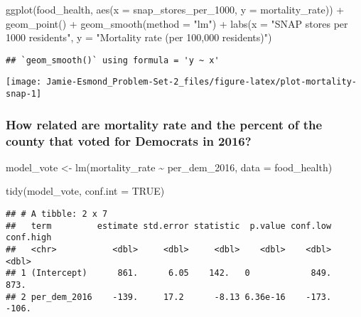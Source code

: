\documentclass[
]{article}
\newenvironment{Shaded}{\begin{snugshade}}{\end{snugshade}}
\newcommand{\AttributeTok}[1]{\textcolor[rgb]{0.77,0.63,0.00}{#1}}
\newcommand{\ConstantTok}[1]{\textcolor[rgb]{0.00,0.00,0.00}{#1}}
\newcommand{\FunctionTok}[1]{\textcolor[rgb]{0.00,0.00,0.00}{#1}}
\newcommand{\NormalTok}[1]{#1}
\newcommand{\OtherTok}[1]{\textcolor[rgb]{0.56,0.35,0.01}{#1}}
\newcommand{\SpecialCharTok}[1]{\textcolor[rgb]{0.00,0.00,0.00}{#1}}
\newcommand{\StringTok}[1]{\textcolor[rgb]{0.31,0.60,0.02}{#1}}
\begin{document}
\begin{Shaded}
\begin{Highlighting}[]
\FunctionTok{ggplot}\NormalTok{(food\_health, }\FunctionTok{aes}\NormalTok{(}\AttributeTok{x =}\NormalTok{ snap\_stores\_per\_1000, }\AttributeTok{y =}\NormalTok{ mortality\_rate)) }\SpecialCharTok{+}
  \FunctionTok{geom\_point}\NormalTok{() }\SpecialCharTok{+}
  \FunctionTok{geom\_smooth}\NormalTok{(}\AttributeTok{method =} \StringTok{"lm"}\NormalTok{) }\SpecialCharTok{+}
  \FunctionTok{labs}\NormalTok{(}\AttributeTok{x =} \StringTok{"SNAP stores per 1000 residents"}\NormalTok{, }
       \AttributeTok{y =} \StringTok{"Mortality rate (per 100,000 residents)"}\NormalTok{)}
\end{Highlighting}
\end{Shaded}

\begin{verbatim}
## `geom_smooth()` using formula = 'y ~ x'
\end{verbatim}

\begin{center}\texttt{[image: Jamie-Esmond\_Problem-Set-2\_files/figure-latex/plot-mortality-snap-1]} \end{center}

\hypertarget{how-related-are-mortality-rate-and-the-percent-of-the-county-that-voted-for-democrats-in-2016}{%
\subsubsection{How related are mortality rate and the percent of the
county that voted for Democrats in
2016?}\label{how-related-are-mortality-rate-and-the-percent-of-the-county-that-voted-for-democrats-in-2016}}

\begin{Shaded}
\begin{Highlighting}[]
\NormalTok{model\_vote }\OtherTok{\textless{}{-}} \FunctionTok{lm}\NormalTok{(mortality\_rate }\SpecialCharTok{\textasciitilde{}}\NormalTok{ per\_dem\_2016,}
                         \AttributeTok{data =}\NormalTok{ food\_health)}

\FunctionTok{tidy}\NormalTok{(model\_vote, }\AttributeTok{conf.int =} \ConstantTok{TRUE}\NormalTok{)}
\end{Highlighting}
\end{Shaded}

\begin{verbatim}
## # A tibble: 2 x 7
##   term         estimate std.error statistic  p.value conf.low conf.high
##   <chr>           <dbl>     <dbl>     <dbl>    <dbl>    <dbl>     <dbl>
## 1 (Intercept)      861.      6.05    142.   0            849.      873.
## 2 per_dem_2016    -139.     17.2      -8.13 6.36e-16    -173.     -106.
\end{verbatim}
\end{document}
